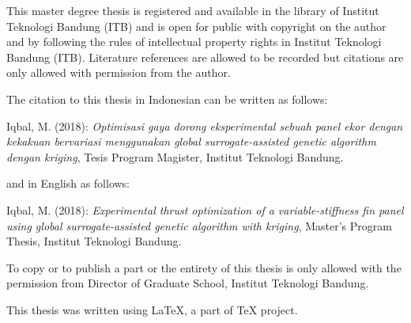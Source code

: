 This master degree thesis is registered and available in the library of Institut Teknologi Bandung (ITB) and is open for public with copyright on the author and by following the rules of intellectual property rights in Institut Teknologi Bandung (ITB). Literature references are allowed to be recorded but citations are only allowed with permission from the author.\par
The citation to this thesis in Indonesian can be written as follows:

Iqbal, M. (2018): \textit{Optimisasi gaya dorong eksperimental sebuah panel ekor dengan kekakuan bervariasi menggunakan global surrogate-assisted genetic algorithm dengan kriging}, Tesis Program Magister, Institut Teknologi Bandung.

and in English as follows:

Iqbal, M. (2018): \textit{Experimental thrust optimization of a variable-stiffness fin panel using global surrogate-assisted genetic algorithm with kriging}, Master's Program Thesis, Institut Teknologi Bandung.

To copy or to publish a part or the entirety of this thesis is only allowed with the permission from Director of Graduate School, Institut Teknologi Bandung.

This thesis was written using LaTeX, a part of TeX project.